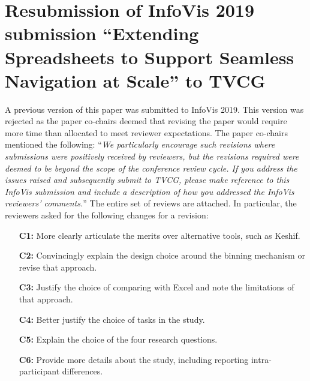 

\section*{Resubmission of InfoVis 2019 submission ``Extending Spreadsheets to Support Seamless
Navigation at Scale'' to TVCG}

A previous version of this paper was submitted to InfoVis 2019. This version was rejected as the paper co-chairs deemed that revising the paper would require more time than allocated to meet reviewer expectations. The paper co-chairs mentioned the following: ``\textit{We particularly encourage such revisions where submissions were positively received by reviewers, but the revisions required were deemed to be beyond the scope of the conference review cycle. If you address the issues raised and subsequently submit to TVCG, please make reference to this  InfoVis submission and include a description of how you addressed the InfoVis reviewers' comments.}'' The entire set of reviews are attached. In particular, the reviewers asked for the following changes for a revision: 
\begin{itemize}
    \item[\textbf{C1:}] More clearly articulate the merits over alternative tools, such as Keshif. 
     \item[\textbf{C2:}] Convincingly explain the design choice around the binning mechanism or revise
    that approach.
    \item[\textbf{C3:}] Justify the choice of comparing with Excel and note the limitations of that
    approach.
     \item[\textbf{C4:}] Better justify the choice of tasks in the study. 
     \item[\textbf{C5:}] Explain the choice of the four research questions.
     \item[\textbf{C6:}] Provide more details about the study, including reporting intra-participant
    differences.
\end{itemize} 
